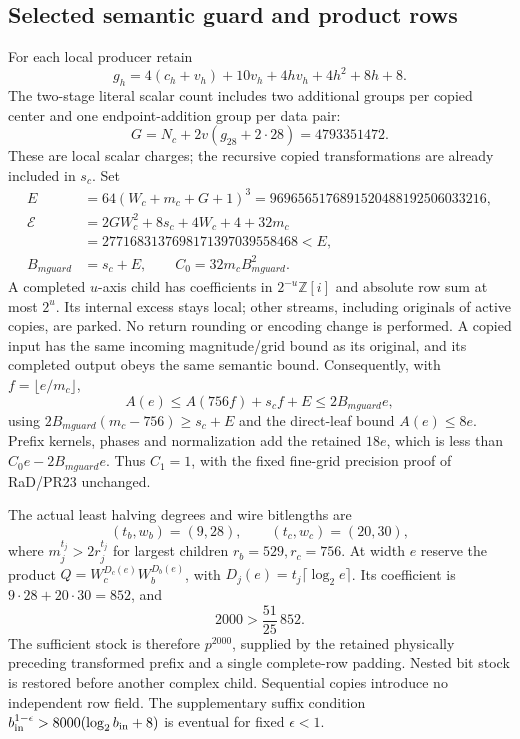 \subsection{Selected semantic guard and product rows}
For each local producer retain
\[
 g_h=4(c_h+v_h)+10v_h+4hv_h+4h^2+8h+8.
\]
The two-stage literal scalar count includes two additional groups per
copied center and one endpoint-addition group per data pair:
\[
 G=N_c+2v(g_{28}+2\cdot28)=4793351472.
\]
These are local scalar charges; the recursive copied transformations
are already included in $s_c$. Set
\[
\begin{aligned}
 E&=64(W_c+m_c+G+1)^3=9696565176891520488192506033216,\\
 \mathcal E&=2GW_c^2+8s_c+4W_c+4+32m_c\\
           &=2771683137698171397039558468<E,\\
 B_{
m guard}&=s_c+E,\qquad C_0=32m_cB_{
m guard}^2.
\end{aligned}
\]
A completed $u$-axis child has coefficients in $2^{-u}\mathbb Z[i]$
and absolute row sum at most $2^u$. Its internal excess stays local;
other streams, including originals of active copies, are parked.
No return rounding or encoding change is performed. A copied input
has the same incoming magnitude/grid bound as its original, and its
completed output obeys the same semantic bound. Consequently, with
$f=\lfloor e/m_c\rfloor$,
\[
 A(e)\le A(756f)+s_cf+E\le2B_{
m guard}e,
\]
using $2B_{
m guard}(m_c-756)\ge s_c+E$ and the direct-leaf bound
$A(e)\le8e$. Prefix kernels, phases and normalization add the retained
$18e$, which is less than $C_0e-2B_{
m guard}e$. Thus $C_1=1$,
with the fixed fine-grid precision proof of RaD/PR23 unchanged.

The actual least halving degrees and wire bitlengths are
\[
 (t_b,w_b)=(9,28),\qquad(t_c,w_c)=(20,30),
\]
where $m_j^{t_j}>2r_j^{t_j}$ for largest children $r_b=529,r_c=756$.
At width $e$ reserve the product
$Q=W_c^{D_c(e)}W_b^{D_b(e)}$, with
$D_j(e)=t_j\lceil\log_2e\rceil$. Its coefficient is
$9\cdot28+20\cdot30=852$, and
\[
 2000>\frac{51}{25}\,852.
\]
The sufficient stock is therefore $p^{2000}$, supplied by the retained
physically preceding transformed prefix and a single complete-row
padding. Nested bit stock is restored before another complex child.
Sequential copies introduce no independent row field. The supplementary
suffix condition $b_{\rm in}^{1-\epsilon}>8000(\log_2b_{\rm in}+8)$
is eventual for fixed $\epsilon<1$.

